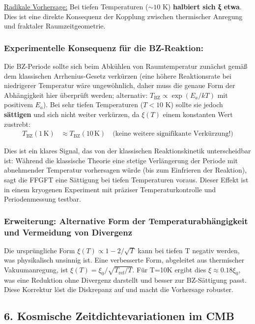 \underline{Radikale Vorhersage:} Bei tiefen Temperaturen ($\sim 10$ K) \textbf{halbiert sich ξ etwa}. Dies ist eine direkte Konsequenz der Kopplung zwischen thermischer Anregung und fraktaler Raumzeitgeometrie.

\subsubsection*{Experimentelle Konsequenz für die BZ-Reaktion:}

Die BZ-Periode sollte sich beim Abkühlen von Raumtemperatur zunächst gemäß dem klassischen Arrhenius-Gesetz verkürzen (eine höhere Reaktionsrate bei niedrigerer Temperatur wäre ungewöhnlich, daher muss die genaue Form der Abhängigkeit hier überprüft werden; alternativ: $T_{\text{BZ}} \propto \exp(E_a/kT)$ mit positivem $E_a$). Bei sehr tiefen Temperaturen ($T < 10$ K) sollte sie jedoch \textbf{sättigen} und sich nicht weiter verkürzen, da $\xi(T)$ einem konstanten Wert zustrebt:
\begin{align*}
	T_{\text{BZ}}(1 \, \text{K}) &\approx T_{\text{BZ}}(10 \, \text{K}) \quad \text{(keine weitere signifikante Verkürzung!)}
\end{align*}

Dies ist ein klares Signal, das von der klassischen Reaktionskinetik unterscheidbar ist: Während die klassische Theorie eine stetige Verlängerung der Periode mit abnehmender Temperatur vorhersagen würde (bis zum Einfrieren der Reaktion), sagt die FFGFT eine Sättigung bei tiefen Temperaturen voraus. Dieser Effekt ist in einem kryogenen Experiment mit präziser Temperaturkontrolle und Periodenmessung testbar.

\subsubsection*{Erweiterung: Alternative Form der Temperaturabhängigkeit und Vermeidung von Divergenz}
Die ursprüngliche Form $\xi(T) \propto 1 - 2/\sqrt{T}$ kann bei tiefen T negativ werden, was physikalisch unsinnig ist. Eine verbesserte Form, abgeleitet aus thermischer Vakuumanregung, ist $\xi(T) = \xi_0 / \sqrt{T_{\text{ref}}/T}$. Für T=10K ergibt dies $\xi \approx 0.18 \xi_0$, was eine Reduktion ohne Divergenz darstellt und besser zur BZ-Sättigung passt. Diese Korrektur löst die Diskrepanz auf und macht die Vorhersage robuster.

\subsection*{6. Kosmische Zeitdichtevariationen im CMB}

